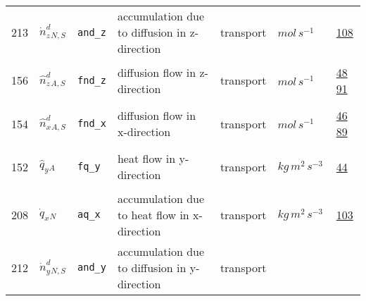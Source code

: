 \begin{longtable}{|p{1cm}|p{2.5cm}|p{4.5cm}|p{8cm}|p{3.0cm}|p{3cm}|p{1cm}|}
                 \\
            213
             & \hypertarget{"v:213"}{ $ {{\dot{n}^d_z}}{_{N, S}} $}
             & \verb|and_z|
             & accumulation due to diffusion in z-direction
             & \begin{lay}transport \end{lay}
             & $ mol \,s^{-1} \, $
             &                 \hyperlink{"e:108"}{ 108 }
                 \\
            156
             & \hypertarget{"v:156"}{ $ {{\hat{n}^{d}_z}}{_{A, S}} $}
             & \verb|fnd_z|
             & diffusion flow in z-direction
             & \begin{lay}transport \end{lay}
             & $ mol \,s^{-1} \, $
             &                 \hyperlink{"e:48"}{ 48 }
                                 \hyperlink{"e:91"}{ 91 }
                 \\
            154
             & \hypertarget{"v:154"}{ $ {{\hat{n}^{d}_x}}{_{A, S}} $}
             & \verb|fnd_x|
             & diffusion flow in x-direction
             & \begin{lay}transport \end{lay}
             & $ mol \,s^{-1} \, $
             &                 \hyperlink{"e:46"}{ 46 }
                                 \hyperlink{"e:89"}{ 89 }
                 \\
            152
             & \hypertarget{"v:152"}{ $ {{\hat{q}_y}}{_{A}} $}
             & \verb|fq_y|
             & heat flow in y-direction
             & \begin{lay}transport \end{lay}
             & $ kg \,m^{2} \,s^{-3} \, $
             &                 \hyperlink{"e:44"}{ 44 }
                 \\
            208
             & \hypertarget{"v:208"}{ $ {{\dot{q}_x}}{_{N}} $}
             & \verb|aq_x|
             & accumulation due to heat flow in x-direction
             & \begin{lay}transport \end{lay}
             & $ kg \,m^{2} \,s^{-3} \, $
             &                 \hyperlink{"e:103"}{ 103 }
                 \\
            212
             & \hypertarget{"v:212"}{ $ {{\dot{n}^d_y}}{_{N, S}} $}
             & \verb|and_y|
             & accumulation due to diffusion in y-direction
             & \begin{lay}transport \end{lay}

\end{longtable}
